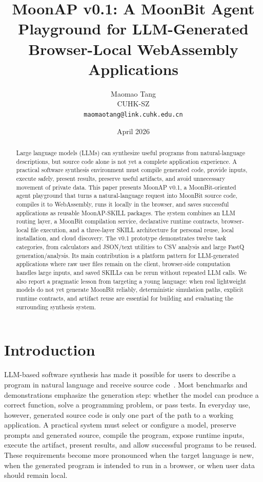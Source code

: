 \documentclass[11pt]{article}
\title{\textbf{MoonAP v0.1: A MoonBit Agent Playground for LLM-Generated Browser-Local WebAssembly Applications}}
\author{
  Maomao Tang\\
  CUHK-SZ\\
  \texttt{maomaotang@link.cuhk.edu.cn}
}
\date{April 2026}
\newcommand{\moonap}{MoonAP}
\newcommand{\skill}{SKILL}
\newcommand{\wasm}{WebAssembly}
\begin{document}
\maketitle

\begin{abstract}
Large language models (LLMs) can synthesize useful programs from natural-language descriptions, but source code alone is not yet a complete application experience. A practical software synthesis environment must compile generated code, provide inputs, execute safely, present results, preserve useful artifacts, and avoid unnecessary movement of private data. This paper presents \moonap{} v0.1, a MoonBit-oriented agent playground that turns a natural-language request into MoonBit source code, compiles it to \wasm{}, runs it locally in the browser, and saves successful applications as reusable \moonap{}-\skill{} packages. The system combines an LLM routing layer, a MoonBit compilation service, declarative runtime contracts, browser-local file execution, and a three-layer \skill{} architecture for personal reuse, local installation, and cloud discovery. The v0.1 prototype demonstrates twelve task categories, from calculators and JSON/text utilities to CSV analysis and large FastQ generation/analysis. Its main contribution is a platform pattern for LLM-generated applications where raw user files remain on the client, browser-side computation handles large inputs, and saved \skill{}s can be rerun without repeated LLM calls. We also report a pragmatic lesson from targeting a young language: when real lightweight models do not yet generate MoonBit reliably, deterministic simulation paths, explicit runtime contracts, and artifact reuse are essential for building and evaluating the surrounding synthesis system.
\end{abstract}

\section{Introduction}

LLM-based software synthesis has made it possible for users to describe a program in natural language and receive source code~\cite{chen2021evaluating,austin2021program,li2022competition}. Most benchmarks and demonstrations emphasize the generation step: whether the model can produce a correct function, solve a programming problem, or pass tests. In everyday use, however, generated source code is only one part of the path to a working application. A practical system must select or configure a model, preserve prompts and generated source, compile the program, expose runtime inputs, execute the artifact, present results, and allow successful programs to be reused. These requirements become more pronounced when the target language is new, when the generated program is intended to run in a browser, or when user data should remain local.
\end{document}
